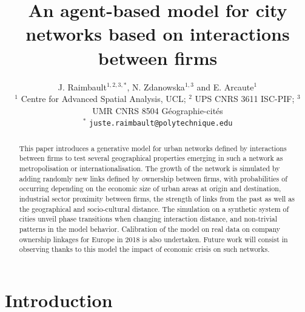 \documentclass[11pt]{article}
\title{An agent-based model for city networks based on interactions between firms}
\date{}
\begin{document}
\author{J. Raimbault$^{1,2,3,\ast}$, N. Zdanowska$^{1,3}$ and E. Arcaute$^1$\\\medskip\small
$^{1}$ Centre for Advanced Spatial Analysis, UCL; $^{2}$ UPS CNRS 3611 ISC-PIF; $^{3}$ UMR CNRS 8504 G{\'e}ographie-cit{\'e}s\\
$^{\ast}$ \texttt{juste.raimbault@polytechnique.edu}
}

\maketitle

\begin{abstract}
    This paper introduces a generative model for urban networks defined by interactions between firms to test several geographical properties emerging in such a network as metropolisation or internationalisation. The growth of the network is simulated by adding randomly new links defined by ownership between firms, with probabilities of occurring depending on the economic size of urban areas at origin and destination, industrial sector proximity between firms, the strength of links from the past as well as the geographical and socio-cultural distance. The simulation on a synthetic system of cities unveil phase transitions when changing interaction distance, and non-trivial patterns in the model behavior. Calibration of the model on real data on company ownership linkages for Europe in 2018 is also undertaken. Future work will consist in observing thanks to this model the impact of economic crisis on such networks.
    
    
\end{abstract}

\section{Introduction}
\end{document}

